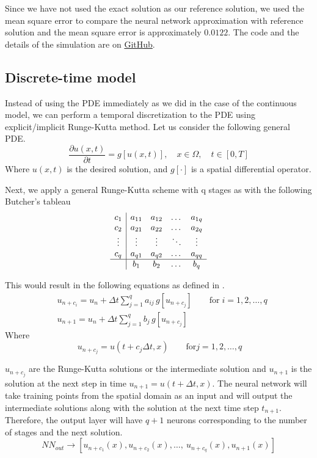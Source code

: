\documentclass[a4paper,12pt]{article}
\theoremstyle{definition}
\begin{document}
Since we have not used the 
exact solution as our reference solution, we used the mean square error to compare the neural network approximation 
with reference solution and the mean square error is approximately $0.0122$. The code and the details of the simulation
are on \href{https://github.com/HashimAlSadah/MX-Project/blob/main/PINN/continuous_time_model/Continuous_time_PINN_Burgers_PDE.ipynb}
{GitHub}.

\subsection{Discrete-time model}
Instead of using the PDE immediately as we did in the case of the continuous model, 
we can perform a temporal discretization to the PDE using explicit/implicit Runge-Kutta method\cite{raissi2019physics}.
Let us consider the following general PDE.
\begin{equation}\label{main_discrete_time_eq}
\frac{\partial u(x,t)}{\partial t} = g[u(x,t)], \quad x \in \Omega, \quad t \in [0, T]
\end{equation}
Where $u(x,t)$ is the desired solution, and $g[\cdot]$ is a spatial differential operator.

Next, we apply a general Runge-Kutta scheme with q stages as with the following Butcher's tableau 
$$
\begin{array}{c|cccc}
c_1 & a_{11} & a_{12} & \dots & a_{1q} \\ 
c_2 & a_{21} & a_{22} & \dots & a_{2q} \\ 
\vdots & \vdots & \vdots & \ddots & \vdots \\ 
c_q & a_{q1} & a_{q2} & \dots & a_{qq} \\ 
\hline
& b_1 & b_2 & \dots & b_q
\end{array}
$$

This would result in the following equations as defined in \cite{iserles2009first}.
\begin{equation}\label{RK_discrt}
\begin{aligned}
& u_{n+c_i} = u_n + \Delta t \sum_{j=1}^{q} a_{ij} \, g[u_{n+c_j}] \qquad \text{for} \; i = 1, 2, \dots, q \\
& u_{n+1} = u_n + \Delta t \sum_{j=1}^{q} b_j \, g[u_{n+c_j}] 
\end{aligned}
\end{equation}
Where 
$$\: u_{n+c_j} = u(t+c_j \Delta t, x) \qquad \text{for} j = 1, 2, \dots, q$$ 

$u_{n + c_j}$ are the Runge-Kutta solutions or the intermediate solution and 
$u_{n+1}$ is the solution at the next step in time $u_{n+1} = u(t + \Delta t, x)$.
The neural network will take training points from the spatial domain as an input 
and will output the intermediate solutions along with the solution at the next time step $t_{n+1}$.
Therefore, the output layer will have $q+1$ neurons corresponding to the number of stages and the next 
solution. 
\begin{equation}\label{NN_RK_output}
NN_{out} \rightarrow [u_{n+c_1}(x), u_{n+c_2}(x), \dots, \ u_{n+c_q}(x), u_{n+1}(x)]
\end{equation}
\end{document}
